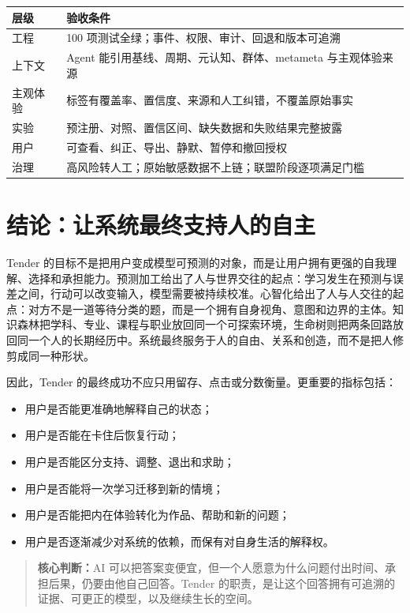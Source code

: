 \documentclass[UTF8,a4paper,11pt]{ctexart}
\newcommand{\keypoint}[1]{\begin{quote}\noindent\textbf{\color{TenderBlue}核心判断：}#1\end{quote}}
\begin{document}
\begin{center}
\begin{longtable}{@{}p{4.3cm}p{8.5cm}@{}}
\toprule
\textbf{层级} & \textbf{验收条件} \\
\midrule
工程 & 100 项测试全绿；事件、权限、审计、回退和版本可追溯 \\
上下文 & Agent 能引用基线、周期、元认知、群体、metameta 与主观体验来源 \\
主观体验 & 标签有覆盖率、置信度、来源和人工纠错，不覆盖原始事实 \\
实验 & 预注册、对照、置信区间、缺失数据和失败结果完整披露 \\
用户 & 可查看、纠正、导出、静默、暂停和撤回授权 \\
治理 & 高风险转人工；原始敏感数据不上链；联盟阶段逐项满足门槛 \\
\bottomrule
\end{longtable}
\end{center}

\newpage
\section{结论：让系统最终支持人的自主}

Tender 的目标不是把用户变成模型可预测的对象，而是让用户拥有更强的自我理解、选择和承担能力。预测加工给出了人与世界交往的起点：学习发生在预测与误差之间，行动可以改变输入，模型需要被持续校准。心智化给出了人与人交往的起点：对方不是一道等待分类的题，而是一个拥有自身视角、意图和边界的主体。知识森林把学科、专业、课程与职业放回同一个可探索环境，生命树则把两条回路放回同一个人的长期经历中。系统最终服务于人的自由、关系和创造，而不是把人修剪成同一种形状。

因此，Tender 的最终成功不应只用留存、点击或分数衡量。更重要的指标包括：

\begin{itemize}
\item 用户是否能更准确地解释自己的状态；
\item 用户是否能在卡住后恢复行动；
\item 用户是否能区分支持、调整、退出和求助；
\item 用户是否能将一次学习迁移到新的情境；
\item 用户是否能把内在体验转化为作品、帮助和新的问题；
\item 用户是否逐渐减少对系统的依赖，而保有对自身生活的解释权。
\end{itemize}

\keypoint{AI 可以把答案变便宜，但一个人愿意为什么问题付出时间、承担后果，仍要由他自己回答。Tender 的职责，是让这个回答拥有可追溯的证据、可更正的模型，以及继续生长的空间。}
\end{document}
